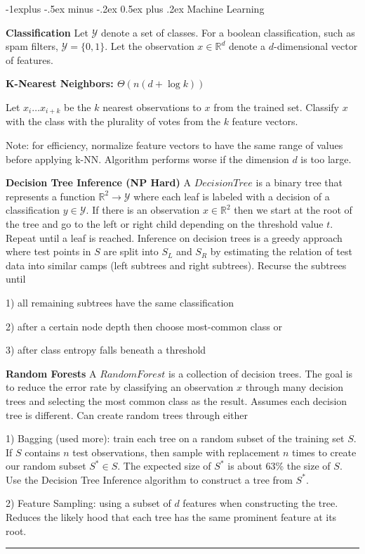 \documentclass[landscape]{article}
\makeatletter
\renewcommand{\subsection}{\@startsection{subsection}{2}{0mm}%
                            {-1explus -.5ex minus -.2ex}%
                            {0.5ex plus .2ex}%
                            {\normalfont\normalsize\bfseries}}
\makeatother
\begin{document}
\begin{multicols}{3}
\subsection{Machine Learning}

\textbf{Classification}
Let $\mathcal{Y}$ denote a set of classes. For a boolean classification, such as spam filters, $\mathcal{Y} = \{0, 1\}$. Let the observation $x \in \mathbb{R}^d$ denote a $d$-dimensional vector of features.

\textbf{K-Nearest Neighbors: $\Theta(n(d + \log k))$}

Let $x_i \ldots x_{i+k}$ be the $k$ nearest observations to $x$ from the trained set. Classify $x$ with the class with the plurality of votes from the $k$ feature vectors.

Note: for efficiency, normalize feature vectors to have the same range of values before applying k-NN. Algorithm performs worse if the dimension $d$ is too large.

\textbf{Decision Tree Inference (NP Hard)}
A $Decision Tree$ is a binary tree that represents a function $\mathbb{R}^2 \rightarrow \mathcal{Y}$ where each leaf is labeled with a decision of a classification $y \in \mathcal{Y}$. If there is an observation $x \in \mathbb{R}^2$ then we start at the root of the tree and go to the left or right child depending on the threshold value $t$. Repeat until a leaf is reached. Inference on decision trees is a greedy approach where test points in $S$ are split into $S_L$ and $S_R$ by estimating the relation of test data into similar camps (left subtrees and right subtrees). Recurse the subtrees until 

1) all remaining subtrees have the same classification

2) after a certain node depth then choose most-common class or

3) after class entropy falls beneath a threshold

\textbf{Random Forests}
A $RandomForest$ is a collection of decision trees. The goal is to reduce the error rate by classifying an observation $x$ through many decision trees and selecting the most common class as the result. Assumes each decision tree is different. Can create random  trees through either

1) Bagging (used more): train each tree on a random subset of the training set $S$. If $S$ contains $n$ test observations, then sample with replacement $n$ times to create our random subset $S^* \in S$. The expected size of $S^*$ is about 63\% the size of $S$. Use the Decision Tree Inference algorithm to construct a tree from $S^*$.

2) Feature Sampling: using a subset of $d$ features when constructing the tree. Reduces the likely hood that each tree has the same prominent feature at its root.

\rule{0.3\linewidth}{0.25pt}
\newpage
\scriptsize


\end{multicols}
\end{document}
